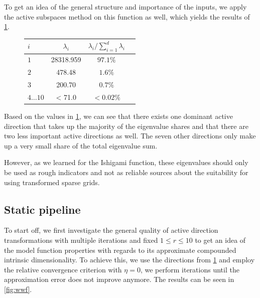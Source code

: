 \documentclass[
  a4paper,  %
  twoside,  %
  bibliography=totoc,
  headsepline,
  cleardoublepage=empty,
  parskip=half,
  draft=false
]{scrbook}
\begin{document}
%
To get an idea of the general structure and importance of the inputs, we apply the active subspaces method on this function as well, which yields the results of \cref{tab:ww_as}.
\begin{mdframed}[style=style]
\begin{figure}[H]
\vspace{-2mm}
\centering
\bgroup
\def\arraystretch{1.2}%
  \begin{tabular}{ l | c c c}
$i$ & $\lambda_i$ & $\lambda_i / \sum_{i=1}^d \lambda_i$\\
\hline
$1$  & 28318.959 & $97.1\%$\\
$2$   & 478.48 & $1.6\%$\\
$3$  & 200.70 & $0.7\%$\\
$4 \dots 10$  & < 71.0 & $< 0.02\%$\\
\end{tabular}
\egroup
\vspace{0.5em}

\delimit

\label{tab:ww_as}
\end{figure}
\end{mdframed}
%
Based on the values in \cref{tab:ww_as}, we can see that there exists one dominant active direction that takes up the majority of the eigenvalue shares and that there are two less important active directions as well.
The seven other directions only make up a very small share of the total eigenvalue sum.

\noindent However, as we learned for the Ishigami function, these eigenvalues should only be used as rough indicators and not as reliable sources about the suitability for using transformed sparse grids.

\subsection{Static pipeline}

To start off, we first investigate the general quality of active direction transformations with multiple iterations and fixed $1 \leq r \leq 10$ to get an idea of the model function properties with regards to its approximate compounded intrinsic dimensionality.
To achieve this, we use the directions from \cref{tab:ww_as} and employ the relative convergence criterion with $\eta=0$, \ie we perform iterations until the approximation error does not improve anymore.
The results can be seen in \cref{fig:wwf}.
\end{document}
